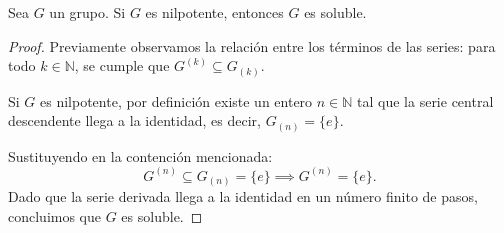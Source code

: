 \begin{prop}
    Sea $G$ un grupo. Si $G$ es nilpotente, entonces $G$ es soluble.
\end{prop}

\begin{proof}
    Previamente observamos la relación entre los términos de las series: para todo $k \in \mathbb{N}$, se cumple que $G^{(k)} \subseteq G_{(k)}$.
    
    Si $G$ es nilpotente, por definición existe un entero $n \in \mathbb{N}$ tal que la serie central descendente llega a la identidad, es decir, $G_{(n)} = \{e\}$.
    
    Sustituyendo en la contención mencionada:
    \begin{equation*}
        G^{(n)} \subseteq G_{(n)} = \{e\} \implies G^{(n)} = \{e\}.
    \end{equation*}
    Dado que la serie derivada llega a la identidad en un número finito de pasos, concluimos que $G$ es soluble.
\end{proof}


